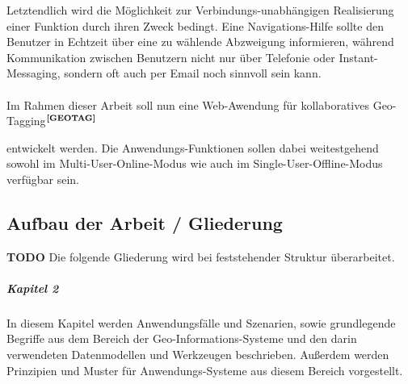 \noindent
Letztendlich wird die Möglichkeit zur Verbindungs-unabhängigen Realisierung einer Funktion durch ihren Zweck bedingt. Eine Navigations-Hilfe sollte den Benutzer in Echtzeit über eine zu wählende Abzweigung informieren, während Kommunikation zwischen Benutzern nicht nur über Telefonie oder Instant-Messaging, sondern oft auch per Email noch sinnvoll sein kann.\\ \\
\noindent
Im Rahmen dieser Arbeit soll nun eine Web-Awendung für kollaboratives Geo-Tagging$^{\textbf{\ref{GEOTAG}}}$%
\addtocounter{footnote}{1}%
entwickelt werden. Die Anwendungs-Funktionen sollen dabei weitestgehend sowohl im Multi-User-Online-Modus wie auch im Single-User-Offline-Modus verfügbar sein.

\subsection{Aufbau der Arbeit / Gliederung}

\textbf{TODO} Die folgende Gliederung wird bei feststehender Struktur überarbeitet.\\
\noindent
\subparagraph{Kapitel 2}
In diesem Kapitel werden Anwendungsfälle und Szenarien, sowie grundlegende Begriffe aus dem Bereich der Geo-Informations-Systeme und den darin verwendeten Datenmodellen und Werkzeugen beschrieben. Außerdem werden Prinzipien und Muster für Anwendungs-Systeme aus diesem Bereich vorgestellt. 


